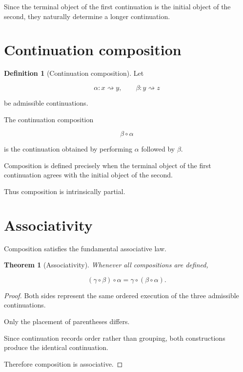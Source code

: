 \documentclass[13pt,openany]{book}
\theoremstyle{plain}
\newtheorem{theorem}{Theorem}[chapter]
\theoremstyle{definition}
\newtheorem{definition}{Definition}[chapter]
\begin{document}
Since the terminal object of the first continuation is the initial object of
the second, they naturally determine a longer continuation.

\section{Continuation composition}

\begin{definition}[Continuation composition]
Let

\[
\alpha:x\rightsquigarrow y,
\qquad
\beta:y\rightsquigarrow z
\]

be admissible continuations.

The continuation composition

\[
\beta\circ\alpha
\]

is the continuation obtained by performing $\alpha$ followed by $\beta$.
\end{definition}

Composition is defined precisely when the terminal object of the first
continuation agrees with the initial object of the second.

Thus composition is intrinsically partial.

\section{Associativity}

Composition satisfies the fundamental associative law.

\begin{theorem}[Associativity]
Whenever all compositions are defined,

\[
(\gamma\circ\beta)\circ\alpha
=
\gamma\circ(\beta\circ\alpha).
\]
\end{theorem}

\begin{proof}
Both sides represent the same ordered execution of the three admissible
continuations.

Only the placement of parentheses differs.

Since continuation records order rather than grouping, both constructions
produce the identical continuation.

Therefore composition is associative.
\end{proof}
\end{document}
